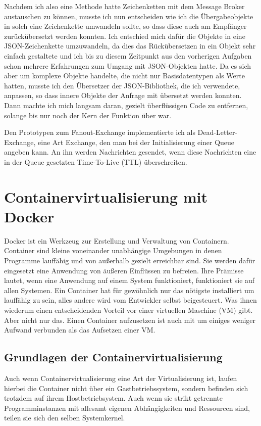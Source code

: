 \documentclass[12pt,a4paper]{scrartcl}
\begin{document}
Nachdem ich also eine Methode hatte Zeichenketten mit dem Message Broker austauschen zu können, musste ich nun entscheiden wie ich die Übergabeobjekte in solch eine Zeichenkette umwandeln sollte, so dass diese auch am Empfänger zurückübersetzt werden konnten.
Ich entschied mich dafür die Objekte in eine JSON-Zeichenkette umzuwandeln, da dies das Rückübersetzen in ein Objekt sehr einfach gestaltete und ich bis zu diesem Zeitpunkt aus den vorherigen Aufgaben schon mehrere Erfahrungen zum Umgang mit JSON-Objekten hatte. 
Da es sich aber um komplexe Objekte handelte, die nicht nur Basisdatentypen als Werte hatten, musste ich den Übersetzer der JSON-Bibliothek, die ich verwendete, anpassen, so dass innere Objekte der Anfrage mit übersetzt werden konnten. 
Dann machte ich mich langsam daran, gezielt überflüssigen Code zu entfernen, solange bis nur noch der Kern der Funktion über war.

Den Prototypen zum Fanout-Exchange implementierte ich als Dead-Letter-Exchange, eine Art Exchange, den man bei der Initialisierung einer Queue angeben kann. An ihn werden Nachrichten gesendet, wenn diese Nachrichten eine in der Queue gesetzten Time-To-Live (TTL) überschreiten.

\section{Containervirtualisierung mit Docker} \label{docker}
Docker ist ein Werkzeug zur Erstellung und Verwaltung von Containern. 
Container sind kleine voneinander unabhängige Umgebungen in denen Programme lauffähig und von außerhalb gezielt erreichbar sind. Sie werden dafür eingesetzt eine Anwendung von äußeren Einflüssen zu befreien. Ihre Prämisse lautet, wenn eine Anwendung auf einem System funktioniert, funktioniert sie auf allen Systemen. Ein Container hat für gewöhnlich nur das nötigste installiert um lauffähig zu sein, alles andere wird vom Entwickler selbst beigesteuert. Was ihnen wiederum einen entscheidenden Vorteil vor einer virtuellen Maschine (VM) gibt. Aber nicht nur das. Einen Container aufzusetzen ist auch mit um einiges weniger Aufwand verbunden als das Aufsetzen einer VM. 

\subsection{Grundlagen der Containervirtualisierung}

Auch wenn Containervirtualisierung eine Art der Virtualisierung ist, laufen hierbei die Container nicht über ein Gastbetriebssystem, sondern befinden sich trotzdem auf ihrem Hostbetriebsystem. Auch wenn sie strikt getrennte Programminstanzen mit allesamt eigenen Abhängigkeiten und Ressourcen sind, teilen sie sich den selben Systemkernel. 
\end{document}
